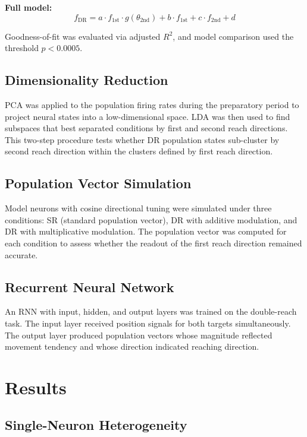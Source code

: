 \documentclass[12pt]{article}
\begin{document}
\textbf{Full model:}
\begin{equation}
f_{\text{DR}} = a \cdot f_{\text{1st}} \cdot g(\theta_{\text{2nd}}) + b \cdot f_{\text{1st}} + c \cdot f_{\text{2nd}} + d
\label{eq:full}
\end{equation}

Goodness-of-fit was evaluated via adjusted $R^2$, and model comparison used the threshold $p < 0.0005$.

\subsection{Dimensionality Reduction}

PCA was applied to the population firing rates during the preparatory period to project neural states into a low-dimensional space. LDA was then used to find subspaces that best separated conditions by first and second reach directions. This two-step procedure tests whether DR population states sub-cluster by second reach direction within the clusters defined by first reach direction.

\subsection{Population Vector Simulation}

Model neurons with cosine directional tuning were simulated under three conditions: SR (standard population vector), DR with additive modulation, and DR with multiplicative modulation. The population vector was computed for each condition to assess whether the readout of the first reach direction remained accurate.

\subsection{Recurrent Neural Network}

An RNN with input, hidden, and output layers was trained on the double-reach task. The input layer received position signals for both targets simultaneously. The output layer produced population vectors whose magnitude reflected movement tendency and whose direction indicated reaching direction.

\section{Results}

\subsection{Single-Neuron Heterogeneity}
\end{document}
